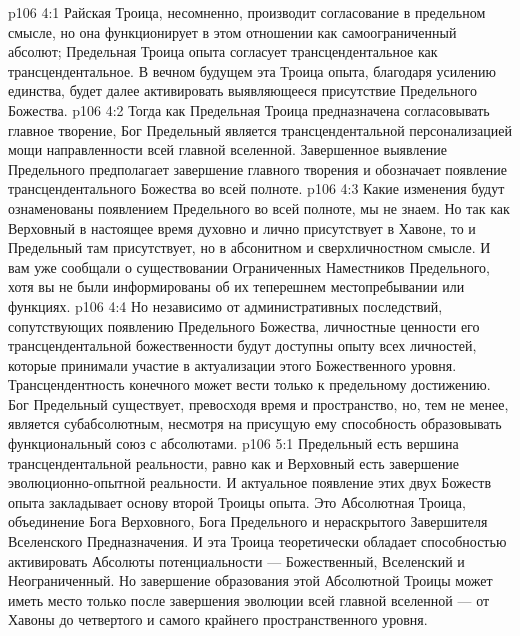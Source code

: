 \vs p106 4:1 Райская Троица, несомненно, производит согласование в предельном смысле, но она функционирует в этом отношении как самоограниченный абсолют; Предельная Троица опыта согласует трансцендентальное как трансцендентальное. В вечном будущем эта Троица опыта, благодаря усилению единства, будет далее активировать выявляющееся присутствие Предельного Божества.
\vs p106 4:2 Тогда как Предельная Троица предназначена согласовывать главное творение, Бог Предельный является трансцендентальной персонализацией мощи направленности всей главной вселенной. Завершенное выявление Предельного предполагает завершение главного творения и обозначает появление трансцендентального Божества во всей полноте.
\vs p106 4:3 Какие изменения будут ознаменованы появлением Предельного во всей полноте, мы не знаем. Но так как Верховный в настоящее время духовно и лично присутствует в Хавоне, то и Предельный там присутствует, но в абсонитном и сверхличностном смысле. И вам уже сообщали о существовании Ограниченных Наместников Предельного, хотя вы не были информированы об их теперешнем местопребывании или функциях.
\vs p106 4:4 Но независимо от административных последствий, сопутствующих появлению Предельного Божества, личностные ценности его трансцендентальной божественности будут доступны опыту всех личностей, которые принимали участие в актуализации этого Божественного уровня. Трансцендентность конечного может вести только к предельному достижению. Бог Предельный существует, превосходя время и пространство, но, тем не менее, является субабсолютным, несмотря на присущую ему способность образовывать функциональный союз с абсолютами.
\vs p106 5:1 Предельный есть вершина трансцендентальной реальности, равно как и Верховный есть завершение эволюционно\hyp{}опытной реальности. И актуальное появление этих двух Божеств опыта закладывает основу второй Троицы опыта. Это Абсолютная Троица, объединение Бога Верховного, Бога Предельного и нераскрытого Завершителя Вселенского Предназначения. И эта Троица теоретически обладает способностью активировать Абсолюты потенциальности --- Божественный, Вселенский и Неограниченный. Но завершение образования этой Абсолютной Троицы может иметь место только после завершения эволюции всей главной вселенной --- от Хавоны до четвертого и самого крайнего пространственного уровня.
